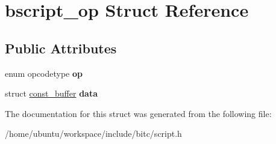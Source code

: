 \hypertarget{structbscript__op}{\section{bscript\-\_\-op Struct Reference}
\label{structbscript__op}
}
\subsection*{Public Attributes}
\begin{DoxyCompactItemize}
\item 
\hypertarget{structbscript__op_aff32c80c1f73adb52151b4ce9502b79f}{enum opcodetype {\bfseries op}}\label{structbscript__op_aff32c80c1f73adb52151b4ce9502b79f}

\item 
\hypertarget{structbscript__op_ae5f91be22dbdf64715431d1db0d4f97a}{struct \hyperlink{structconst__buffer}{const\-\_\-buffer} {\bfseries data}}\label{structbscript__op_ae5f91be22dbdf64715431d1db0d4f97a}

\end{DoxyCompactItemize}


The documentation for this struct was generated from the following file\-:\begin{DoxyCompactItemize}
\item 
/home/ubuntu/workspace/include/bitc/script.\-h\end{DoxyCompactItemize}
